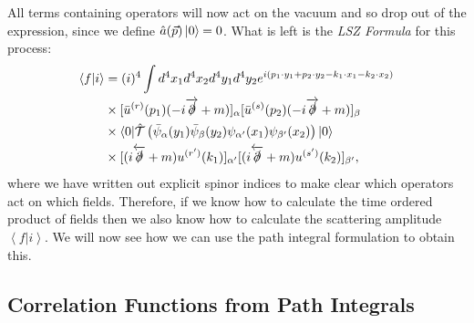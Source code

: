 All terms containing operators will now act on the vacuum and so drop out of the expression, since we define $\hat{a}(\vec{p}) \mathinner{\lvert0\rangle}_{\hspace{-0.1em}} = 0$. What is left is the \emph{LSZ Formula} for this process:
\begin{equation}
\label{LSZform}
\begin{split}
\left<f | i\right> &= (i)^4 \int d^4 x_1 d^4 x_2 d^4 y_1 d^4 y_2 e^{i(p_1 \cdot y_1 + p_2 \cdot y_2 - k_1 \cdot x_1 - k_2 \cdot x_2)} \\
&\times  [\bar{u}^{(r)}(p_1)(- i \overrightarrow{\slashed{\partial}} + m)]_\alpha [\bar{u}^{(s)}(p_2)(- i \overrightarrow{\slashed{\partial}} + m)]_\beta \\
& \times \mathinner{\langle0\vert\hat{\mathcal{T}} \left(\bar{\psi}_\alpha(y_1) \bar{\psi}_\beta(y_2) \psi_{\alpha'}(x_1) \psi_{\beta'}(x_2) \right)\vert0\rangle}_{} \\
& \times [(i \overleftarrow{\slashed{\partial}} + m)u^{(r')}(k_1)]_{\alpha' }[(i \overleftarrow{\slashed{\partial}} + m)u^{(s')}(k_2)]_{\beta'},
\end{split}
\end{equation}
where we have written out explicit spinor indices to make clear which operators act on which fields. Therefore, if we know how to calculate the time ordered product of fields then we also know how to calculate the scattering amplitude $\left<f | i \right>$.  We will now see how we can use the path integral formulation to obtain this.

\subsection{Correlation Functions from Path Integrals}

